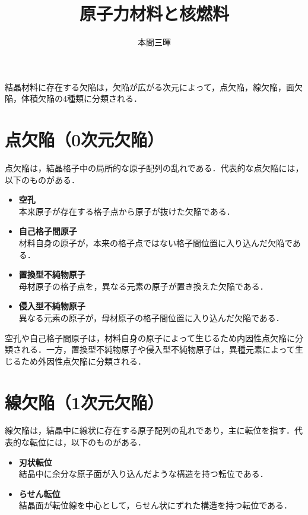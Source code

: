 \documentclass[titlepage,a4paper]{jsarticle}
\title{原子力材料と核燃料}
\author{本間三暉}
\begin{document}
\maketitle

結晶材料に存在する欠陥は，欠陥が広がる次元によって，点欠陥，線欠陥，面欠陥，体積欠陥の4種類に分類される．

\section{点欠陥（0次元欠陥）}

点欠陥は，結晶格子中の局所的な原子配列の乱れである．代表的な点欠陥には，以下のものがある．

\begin{itemize}
    \item \textbf{空孔}\\
    本来原子が存在する格子点から原子が抜けた欠陥である．

    \item \textbf{自己格子間原子}\\
    材料自身の原子が，本来の格子点ではない格子間位置に入り込んだ欠陥である．

    \item \textbf{置換型不純物原子}\\
    母材原子の格子点を，異なる元素の原子が置き換えた欠陥である．

    \item \textbf{侵入型不純物原子}\\
    異なる元素の原子が，母材原子の格子間位置に入り込んだ欠陥である．
\end{itemize}

空孔や自己格子間原子は，材料自身の原子によって生じるため内因性点欠陥に分類される．一方，置換型不純物原子や侵入型不純物原子は，異種元素によって生じるため外因性点欠陥に分類される．

\section{線欠陥（1次元欠陥）}

線欠陥は，結晶中に線状に存在する原子配列の乱れであり，主に転位を指す．代表的な転位には，以下のものがある．

\begin{itemize}
    \item \textbf{刃状転位}\\
    結晶中に余分な原子面が入り込んだような構造を持つ転位である．

    \item \textbf{らせん転位}\\
    結晶面が転位線を中心として，らせん状にずれた構造を持つ転位である．
\end{itemize}
\end{document}
